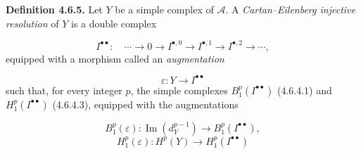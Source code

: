 \medskip\noindent\textbf{Definition 4.6.5.}\quad
Let $Y$ be a simple complex of $\mathcal A$. A \emph{Cartan--Eilenberg
injective resolution} of $Y$ is a double complex

\[
I^{\bullet\bullet}\colon\quad
\cdots\longrightarrow0\longrightarrow I^{\bullet,0}
\longrightarrow I^{\bullet,1}\longrightarrow I^{\bullet,2}
\longrightarrow\cdots,
\]
equipped with a morphism called an \emph{augmentation}

\[
\varepsilon\colon Y\longrightarrow I^{\bullet\bullet}
\]
such that, for every integer $p$, the simple complexes
$B_1^p(I^{\bullet\bullet})$ (4.6.4.1) and
$H_1^p(I^{\bullet\bullet})$ (4.6.4.3), equipped with the augmentations

\[
B_1^p(\varepsilon)\colon
\operatorname{Im}(d_Y^{p-1})\longrightarrow B_1^p(I^{\bullet\bullet}),
\]
\[
H_1^p(\varepsilon)\colon
H^p(Y)\longrightarrow H_1^p(I^{\bullet\bullet})
\]
\endgroup
